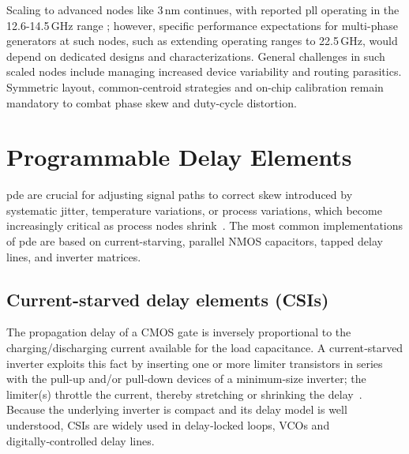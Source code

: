 Scaling to advanced nodes like 3\,nm continues, with reported \gls{pll} operating in the 12.6-14.5\,GHz range \cite{Lu2022JSSC}; however, specific performance expectations for multi-phase generators at such nodes, such as extending operating ranges to 22.5\,GHz, would depend on dedicated designs and characterizations. General challenges in such scaled nodes include managing increased device variability and routing parasitics.
Symmetric layout, common-centroid strategies and on-chip calibration remain mandatory to combat phase skew and duty-cycle distortion.


\section{Programmable Delay Elements}
\gls{pde} are crucial for adjusting signal paths to correct skew introduced by systematic jitter, temperature variations, or process variations, which become increasingly critical as process nodes shrink~\cite{horowitz2005scaling, caignet2001challenge, lee2011self, Park2021, abdulrazzaq2016review}. The most common implementations of \gls{pde} are based on current-starving, parallel NMOS capacitors, tapped delay lines, and inverter matrices.

\subsection{Current-starved delay elements (CSIs)}
The propagation delay of a CMOS gate is inversely proportional to the charging/discharging current available for the load capacitance.  A current‑starved inverter exploits this fact by inserting one or more limiter transistors in series with the pull‑up and/or pull‑down devices of a minimum‑size inverter; the limiter(s) throttle the current, thereby stretching or shrinking the delay~\cite{maymandi2003digitally}.  Because the underlying inverter is compact and its delay model is well understood, CSIs are widely used in delay‑locked loops, VCOs and digitally‑controlled delay lines.

